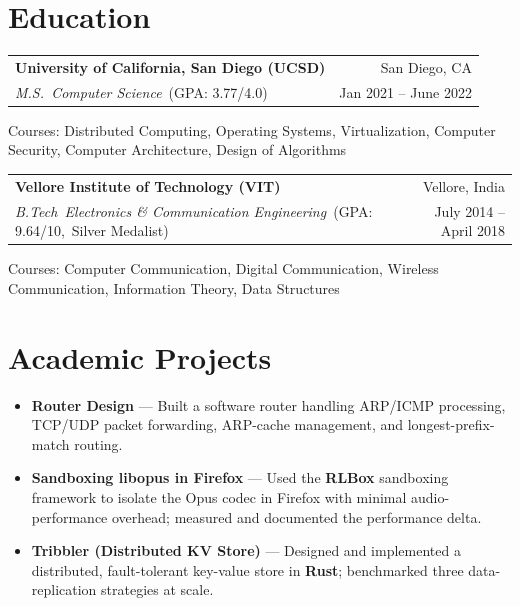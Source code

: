 \documentclass[a4paper,10pt]{article}
\newcommand{\cvperiod}[1]{{\small\color{lighttext}#1}}
\begin{document}
\section{Education}

\vspace{3pt}
\begin{tabularx}{\textwidth}{@{}X r@{}}
  \textbf{University of California, San Diego (UCSD)} & San Diego, CA \\[-1pt]
  \textit{\color{midtext}M.S.\ Computer Science}~\textcolor{lighttext}{\small(GPA: 3.77/4.0)} & \cvperiod{Jan 2021 – June 2022}
\end{tabularx}
\vspace{1pt}
{\small\color{lighttext} Courses: Distributed Computing, Operating Systems, Virtualization, Computer Security, Computer Architecture, Design of Algorithms}

\vspace{6pt}
\begin{tabularx}{\textwidth}{@{}X r@{}}
  \textbf{Vellore Institute of Technology (VIT)} & Vellore, India \\[-1pt]
  \textit{\color{midtext}B.Tech\ Electronics \& Communication Engineering}~\textcolor{lighttext}{\small(GPA: 9.64/10,\ Silver Medalist)} & \cvperiod{July 2014 – April 2018}
\end{tabularx}
\vspace{1pt}
{\small\color{lighttext} Courses: Computer Communication, Digital Communication, Wireless Communication, Information Theory, Data Structures}

\section{Academic Projects}

\begin{itemize}[leftmargin=1.4em, itemsep=4pt, topsep=2pt, parsep=0pt, label={$\circ$}]
  \item \textbf{Router Design} —
    Built a software router handling ARP/ICMP processing, TCP/UDP packet forwarding, ARP-cache management, and longest-prefix-match routing.
  \item \textbf{Sandboxing libopus in Firefox} —
    Used the \textbf{RLBox} sandboxing framework to isolate the Opus codec in Firefox with minimal audio-performance overhead; measured and documented the performance delta.
  \item \textbf{Tribbler (Distributed KV Store)} —
    Designed and implemented a distributed, fault-tolerant key-value store in \textbf{Rust}; benchmarked three data-replication strategies at scale.
\end{itemize}
\end{document}

